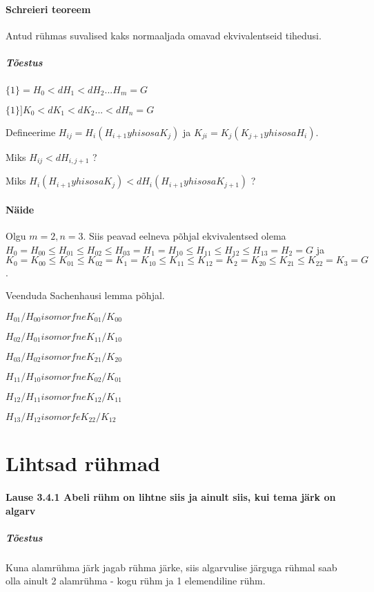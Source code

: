 \documentclass[12pt]{report}
\numberwithin{equation}{section}
\theoremstyle{definition}
\theoremstyle{plain}
\begin{document}
\paragraph{Schreieri teoreem} Antud r\"uhmas suvalised kaks normaaljada omavad ekvivalentseid tihedusi.

\subparagraph{Tõestus}
$\{1\} = H_0 <d H_1 <d H_2 ... H_m= G$

$\{1\}] K_0 <d K_1 <d K_2 ... <d H_n = G$

Defineerime $H_{ij} = H_i(H_{i+1} yhisosa K_j)$ ja $K_{ji} = K_j (K_{j+1} yhisosa H_i)$. 


Miks $H_{ij} <d H_{i,j+1}$ ?


Miks $H_i( H_{i+1} yhisosa K_j) <d H_i(H_{i+1} yhisosa K_{j+1})$ ?

\paragraph{Näide}

Olgu $ m=2, n =3$. Siis peavad eelneva põhjal ekvivalentsed olema $H_0 = H_{00} \leq H_{01} \leq H_{02} \leq H_{03} = H_1=H_{10} \leq H_{11} \leq H_{12} \leq H_{13} = H_2 = G$ ja $K_0 = K_{00} \leq K_{01} \leq K_{02} = K_1 = K_{10} \leq K_{11} \leq K_{12} = K_{2} = K_{20} \leq K_{21} \leq K_{22} = K_3 = G$.

Veenduda Sachenhausi lemma põhjal. 

$H_{01} / H_{00} isomorfne K_{01} / K_{00}$

$H_{02}/ H_{01} isomorfne K_{11}/K_{10}$

$H_{03}/ H_{02} isomorfne K_{21}/K_{20}$

$H_{11} / H_{10} isomorfne K_{02}/K_{01}$

$H_{12} / H_{11} isomorfne K_{12}/K_{11}$

$H_{13} / H_{12} isomorfe K_{22}/K_{12}$

\section{Lihtsad r\"uhmad}

\paragraph{Lause 3.4.1 Abeli rühm on lihtne siis ja ainult siis, kui tema järk on algarv}

\subparagraph{Tõestus}
Kuna alamrühma järk jagab rühma järke, siis algarvulise järguga rühmal saab olla ainult 2 alamrühma - kogu rühm ja 1 elemendiline rühm.
\end{document}
